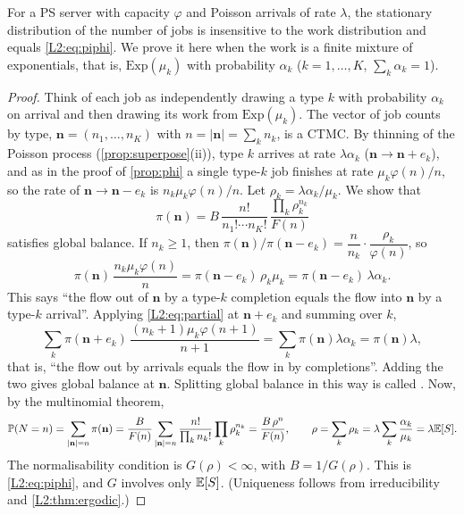 \begin{theorem}\label{thm:insens}
For a PS server with capacity $\varphi$ and Poisson arrivals of rate $\lambda$, the
stationary distribution of the number of jobs is insensitive to the work distribution
and equals \eqref{L2:eq:piphi}. We prove it here when the work is a finite mixture of
exponentials, that is, $\mathrm{Exp}(\mu_k)$ with probability $\alpha_k$
($k=1,\dots,K$, $\sum_k\alpha_k=1$).
\end{theorem}
\begin{proof}
Think of each job as independently drawing a type $k$ with probability $\alpha_k$ on
arrival and then drawing its work from $\mathrm{Exp}(\mu_k)$. The vector of job counts
by type, $\mathbf n=(n_1,\dots,n_K)$ with $n=|\mathbf n|=\sum_kn_k$, is a CTMC. By
thinning of the Poisson process (\cref{prop:superpose}(ii)), type $k$ arrives at rate
$\lambda\alpha_k$ ($\mathbf n\to\mathbf n+e_k$), and as in the proof of \cref{prop:phi}
a single type-$k$ job finishes at rate $\mu_k\varphi(n)/n$, so the rate of
$\mathbf n\to\mathbf n-e_k$ is $n_k\mu_k\varphi(n)/n$.
Let $\rho_k=\lambda\alpha_k/\mu_k$. We show that
\[
  \pi(\mathbf n)=B\,\frac{n!}{n_1!\cdots n_K!}\,\frac{\prod_k\rho_k^{n_k}}{F(n)}
\]
satisfies global balance. If $n_k\ge1$, then
$\pi(\mathbf n)/\pi(\mathbf n-e_k)=\dfrac{n}{n_k}\cdot\dfrac{\rho_k}{\varphi(n)}$, so
\begin{equation}\label{L2:eq:partial}
  \pi(\mathbf n)\,\frac{n_k\mu_k\varphi(n)}{n}=\pi(\mathbf n-e_k)\,\rho_k\mu_k=\pi(\mathbf n-e_k)\,\lambda\alpha_k .
\end{equation}
This says ``the flow out of $\mathbf n$ by a type-$k$ completion equals the flow into
$\mathbf n$ by a type-$k$ arrival''. Applying \eqref{L2:eq:partial} at
$\mathbf n+e_k$ and summing over $k$,
\[
  \sum_k\pi(\mathbf n+e_k)\,\frac{(n_k+1)\mu_k\varphi(n+1)}{n+1}=\sum_k\pi(\mathbf n)\lambda\alpha_k=\pi(\mathbf n)\lambda ,
\]
that is, ``the flow out by arrivals equals the flow in by completions''. Adding the two
gives global balance at $\mathbf n$. Splitting global balance in this way is called
. Now, by the multinomial theorem,
\[
  \mathbb{P}(N=n)=\sum_{|\mathbf n|=n}\pi(\mathbf n)=\frac{B}{F(n)}\sum_{|\mathbf n|=n}\frac{n!}{\prod_kn_k!}\prod_k\rho_k^{n_k}
  =\frac{B\,\rho^n}{F(n)},\qquad \rho=\sum_k\rho_k=\lambda\sum_k\frac{\alpha_k}{\mu_k}=\lambda\mathbb{E}[S].
\]
The normalisability condition is $G(\rho)<\infty$, with $B=1/G(\rho)$. This is
\eqref{L2:eq:piphi}, and $G$ involves only $\mathbb{E}[S]$.
(Uniqueness follows from irreducibility and \cref{L2:thm:ergodic}.)
\end{proof}

